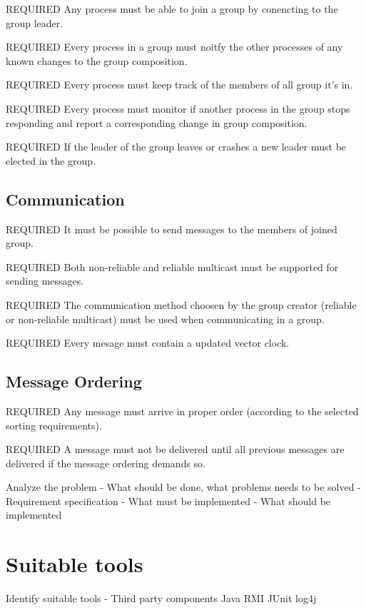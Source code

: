 \documentclass[11pt,swedish]{article}
\begin{document}
REQUIRED Any process must be able to join a group by conencting to the group leader. 

REQUIRED Every process in a group must noitfy the other processes of any known changes to the group composition.

REQUIRED Every process must keep track of the members of all group it's in.

REQUIRED Every process must monitor if another process in the group stops responding and report a corresponding change in group composition.

REQUIRED If the leader of the group leaves or crashes a new leader must be elected in the group.



\subsection{Communication}
REQUIRED It must be possible to send messages to the members of joined group.

REQUIRED Both non-reliable and reliable multicast must be supported for sending messages.

REQUIRED The communication method choosen by the group creator (reliable or non-reliable multicast) must be used when communicating in a group.

REQUIRED Every mesage must contain a updated vector clock.



\subsection{Message Ordering}
REQUIRED Any message must arrive in proper order (according to the selected sorting requirements).

REQUIRED A message must not be delivered until all previous messages are delivered if the message ordering demands so.


Analyze the problem
- What should be done, what problems needs to be solved
- Requirement specification
- What must be implemented
- What should be implemented

\section{Suitable tools}
Identify suitable tools
- Third party components
	Java RMI
	JUnit
	log4j

\end{document}
